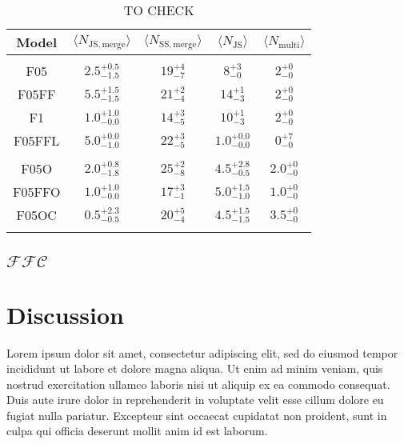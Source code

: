 \documentclass[aa]{aa}
\begin{document}
    \begin{table}
         \caption{TO CHECK}
        \label{Tab:M2Events} 
        \centering 
        \begin{tabular}{c c c c c}
        \hline\hline
        Model & $\langle N_{\mathrm{JS, merge}}\rangle$ & $\langle N_{\mathrm{SS, merge}}\rangle$ & $\langle N_{\mathrm{JS}}\rangle$ &  $\langle N_{\mathrm{multi}} \rangle$ \\
        \hline \vspace{-0.75em}\\ 
           F05     & $2.5^{+0.5}_{-1.5}$ & $19^{+4}_{-7}$ & $8^{+3}_{-0}$  & $2^{+0}_{-0}$ \vspace{0.25em}\\
           F05FF   & $5.5^{+1.5}_{-1.5}$ & $21^{+2}_{-4}$ & $14^{+1}_{-3}$ & $2^{+0}_{-0}$ \vspace{0.25em}\\
           F1      & $1.0^{+1.0}_{-0.0}$ & $14^{+3}_{-5}$ & $10^{+1}_{-3}$ & $2^{+0}_{-0}$ \vspace{0.25em}\\
           F05FFL  & $5.0^{+0.0}_{-1.0}$ & $22^{+3}_{-5}$ & $1.0^{+0.0}_{-0.0}$ & $0^{+7}_{-0}$ \vspace{0.25em}\\
           \hline \vspace{-0.75em}\\
           F05O    & $2.0^{+0.8}_{-1.8}$ & $25^{+2}_{-8}$ & $4.5^{+2.8}_{-0.5}$ & $2.0^{+0}_{-0}$ \vspace{0.25em}\\
           F05FFO  & $1.0^{+1.0}_{-0.0}$ & $17^{+3}_{-1}$ & $5.0^{+1.5}_{-1.0}$ & $1.0^{+0}_{-0}$ \vspace{0.25em}\\
           F05OC   & $0.5^{+2.3}_{-0.5}$ & $20^{+5}_{-4}$ & $4.5^{+1.5}_{-1.5}$ & $3.5^{+0}_{-0}$ \vspace{0.25em}\\
           \hline
         \hline                               %
         \label{Tab:Systems}
        \end{tabular}
     \end{table}
    \subsection{$\mathcal{FFC}$}
    

\section{Discussion}
 Lorem ipsum dolor sit amet, consectetur adipiscing elit, sed do eiusmod tempor incididunt ut labore et dolore magna aliqua. Ut enim ad minim veniam, quis nostrud exercitation ullamco laboris nisi ut aliquip ex ea commodo consequat. Duis aute irure dolor in reprehenderit in voluptate velit esse cillum dolore eu fugiat nulla pariatur. Excepteur sint occaecat cupidatat non proident, sunt in culpa qui officia deserunt mollit anim id est laborum.
\end{document}
